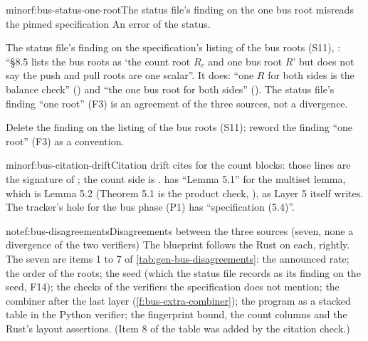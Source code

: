 \begin{finding}{minor}{f:bus-status-one-root}{The status file's finding on the one bus root misreads the pinned specification}
 An error of the status.

 The status file's finding on the specification's listing of the bus roots (S11),
: ``§8.5 lists the bus roots as `the count root $R_c$ and one bus root $R$' but
does not say the push and pull roots are one scalar''. It does: ``one $R$ for both sides is the
balance check'' () and ``the one bus root for both sides'' (). The status
file's finding ``one root'' (F3) is an agreement of the three sources, not a divergence.

 Delete the finding on the listing of the bus roots (S11); reword the
finding ``one root'' (F3) as a convention.
\end{finding}

\begin{finding}{minor}{f:bus-citation-drift}{Citation drift}
  cites  for the count blocks: those lines are
the signature of ; the count side is .  has
``Lemma 5.1'' for the multiset lemma, which is Lemma 5.2 (Theorem 5.1 is the product check,
), as Layer 5 itself writes. The tracker's hole for the bus phase (P1) has
``specification (5.4)''.
\end{finding}

\begin{finding}{note}{f:bus-disagreements}{Disagreements between the three sources (seven, none a divergence of the two verifiers)}
The blueprint follows the Rust on each, rightly. The seven are items 1 to 7 of
\cref{tab:gen-bus-disagreements}: the announced rate; the order of the roots; the seed (which
the status file records as its finding on the seed, F14); the checks of the verifiers the specification does not
mention; the combiner after the last layer (\cref{f:bus-extra-combiner}); the program as a stacked
table in the Python verifier; the fingerprint bound, the count columns and the Rust's layout
assertions. (Item 8 of the table was added by the citation check.)
\end{finding}

